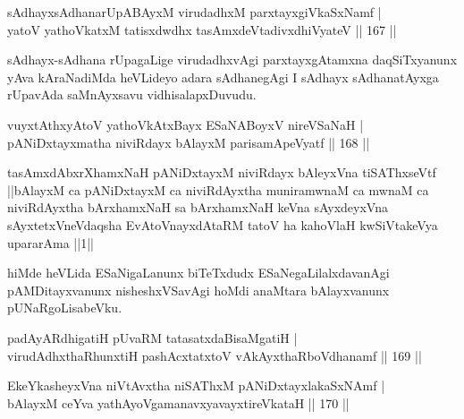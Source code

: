 \begin{shl}
sAdhayxsAdhanarUpABAyxM virudadhxM parxtayxgiVkaSxNamf |\\
yatoV yathoVkatxM tatisxdwdhx tasAmxdeVtadivxdhiVyateV \hfill || 167 ||
\end{shl}

\begin{artha}%
sAdhayx-sAdhana rUpagaLige virudadhxvAgi parxtayxgAtamxna daqSiTxyanunx yAva kAraNadiMda heVLideyo adara sAdhanegAgi I sAdhayx sAdhanatAyxga rUpavAda saMnAyxsavu vidhisalapxDuvudu.
\end{artha}

\begin{shl}
vuyxtAthxyAtoV yathoVkAtxBayx ESaNABoyxV nireVSaNaH |\\
pANiDxtayxmatha niviRdayx bAlayxM parisamApeVyatf \hfill || 168 ||
\end{shl}

\begin{shl}
tasAmxdAbxrXhamxNaH pANiDxtayxM niviRdayx bAleyxVna tiSAThxseVtf ||bAlayxM ca pANiDxtayxM ca niviRdAyxtha muniramwnaM ca mwnaM ca niviRdAyxtha bArxhamxNaH sa bArxhamxNaH keVna sAyxdeyxVna sAyxtetxVneVdaqsha EvAtoV\s nayxdAtaRM tatoV ha kahoVlaH kwSiVtakeVya upararAma ||1||
\end{shl}

\begin{artha}
hiMde heVLida ESaNigaLanunx biTeTxdudx ESaNegaLilalxdavanAgi pAMDitayxvanunx nisheshxVSavAgi hoMdi anaMtara bAlayxvanunx pUNaRgoLisabeVku.
\end{artha}


\begin{shl}
padAyARdhigatiH pUvaRM tatasatxdaBisaMgatiH |\\
virudAdhxthaRhunxtiH pashAcxtatxtoV vAkAyxthaRboVdhanamf \hfill || 169 ||
\end{shl}

\begin{shl}
EkeYkasheyxVna niVtAvx\s tha niSAThxM pANiDxtayxlakaSxNAmf |\\
bAlayxM ceYva yathAyoVgamanavxyavayxtireVkataH \hfill || 170 ||
\end{shl}

